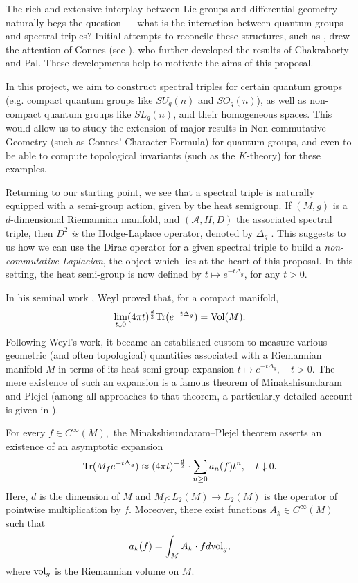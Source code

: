\documentclass[12pt]{article}
\begin{document}
The rich and extensive interplay between Lie groups and differential geometry
naturally begs the question --- what is the interaction between quantum groups
and spectral triples?
Initial attempts to reconcile these structures, such as
\cite{ChakrabortyPal, NeshTus}, drew the attention of Connes (see
\cite{Connes-suq2}), who further developed the results of Chakraborty and Pal.
These developments help to motivate the aims of this proposal.

In this project, we aim to construct spectral triples for certain quantum groups
(e.g. compact quantum groups like $SU_q(n)$ and $SO_q(n)$),
as well as non-compact quantum groups like $SL_q(n)$, and their homogeneous 
spaces.
This would allow us to study the extension of major results in Non-commutative
Geometry (such as Connes' Character Formula) for quantum groups, and even
to be able to compute topological invariants (such as the $K$-theory) for these
examples.

Returning to our starting point, we see that a spectral triple is naturally
equipped with a semi-group action, given by the heat semigroup.
If $(M,g)$ is a $d$-dimensional Riemannian manifold, and $(\mathcal A,H,D)$ the
associated spectral triple, then $D^2$ \textit{is} the Hodge-Laplace operator,
denoted by $\Delta_g$ \cite{Rosenberg}.
This suggests to us how we can use the Dirac operator for a given spectral triple
to build a \textit{non-commutative Laplacian}, the object which lies at the
heart of this proposal.
In this setting, the heat semi-group is now defined by $t\mapsto e^{-t\Delta_g}$,
for any $t>0$.

In his seminal work \cite{Weyl}, Weyl proved that, for a compact manifold,
\begin{equation}\label{weyl formula}
\lim_{t\downarrow0}(4\pi t)^{\frac{d}{2}}{\rm Tr}(e^{-t\Delta_g})={\rm Vol}(M).
\end{equation}
Following Weyl's work, it became an established custom to measure various geometric (and often topological) quantities associated with a Riemannian manifold $M$ in terms of its heat semi-group expansion $t\mapsto e^{-t\Delta_g},\quad t>0.$ The mere existence of such an expansion is a famous theorem of Minakshisundaram and Plejel (among all approaches to that theorem, a particularly detailed account is given in \cite{Rosenberg}). 

For every $f\in C^{\infty}(M),$ the Minakshisundaram--Plejel theorem asserts an existence of an asymptotic expansion 
\begin{equation}\label{heat asymptotic}
{\rm Tr}(M_fe^{-t\Delta_g})\approx (4\pi t)^{-\frac{d}{2}}\cdot \sum_{n\geq0}a_n(f)t^n,\quad t\downarrow0.
\end{equation}
Here, $d$ is the dimension of $M$ and $M_f:L_2(M)\to L_2(M)$ is the operator of pointwise multiplication by $f.$ Moreover, there exist functions $A_k\in C^{\infty}(M)$ such that
\begin{equation}\label{normality of coefficients}
a_k(f)=\int_M A_k\cdot f d{\rm vol}_g,
\end{equation}
where ${\rm vol}_g$ is the Riemannian volume on $M.$
\end{document}
